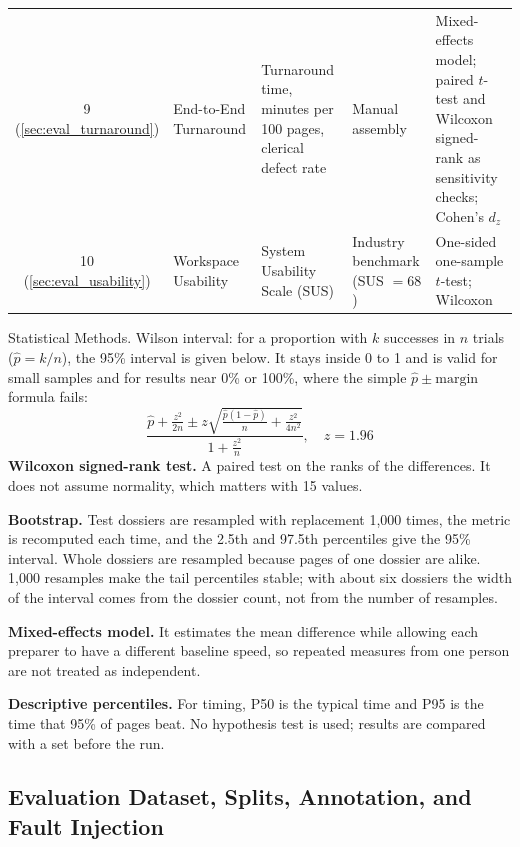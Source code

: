 \begin{table}[H]
\begin{singlespace}
{\begin{tabular}{cp{3.2cm}p{4.2cm}p{3.8cm}p{3.2cm}}
9 (\ref{sec:eval_turnaround}) & End-to-End Turnaround & Turnaround time, minutes per 100 pages, clerical defect rate & Manual assembly & Mixed-effects model; paired $t$-test and Wilcoxon signed-rank as sensitivity checks; Cohen's $d_z$ \\
10 (\ref{sec:eval_usability}) & Workspace Usability & System Usability Scale (SUS) & Industry benchmark (SUS $=68$) & One-sided one-sample $t$-test; Wilcoxon \\
\bottomrule[1.5pt]
\end{tabular}%
}
\end{singlespace}
\end{table}

Statistical Methods. Wilson interval: for a proportion with $k$ successes in $n$ trials ($\hat{p} = k/n$), the 95\% interval is given below.
It stays inside 0 to 1 and is valid for small samples and for results near 0\% or 100\%, where the simple $\hat{p} \pm \text{margin}$ formula fails:
\begin{equation}
\label{eq:wilson_interval}
\frac{\hat{p} + \frac{z^2}{2n} \pm z\sqrt{\frac{\hat{p}(1-\hat{p})}{n} + \frac{z^2}{4n^2}}}{1 + \frac{z^2}{n}}, \quad z = 1.96
\end{equation}
\textbf{Wilcoxon signed-rank test.} A paired test on the ranks of the differences. It does not assume normality, which matters with 15 values.

\textbf{Bootstrap.} Test dossiers are resampled with replacement 1,000 times, the metric is recomputed each time, and the 2.5th and 97.5th percentiles give the 95\% interval. Whole dossiers are resampled because pages of one dossier are alike. 1,000 resamples make the tail percentiles stable; with about six dossiers the width of the interval comes from the dossier count, not from the number of resamples.

\textbf{Mixed-effects model.} It estimates the mean difference while allowing each preparer to have a different baseline speed, so repeated measures from one person are not treated as independent.

\textbf{Descriptive percentiles.} For timing, P50 is the typical time and P95 is the time that 95\% of pages beat. No hypothesis test is used; results are compared with a set before the run.

\subsection{Evaluation Dataset, Splits, Annotation, and Fault Injection}
\label{sec:eval_dataset}

